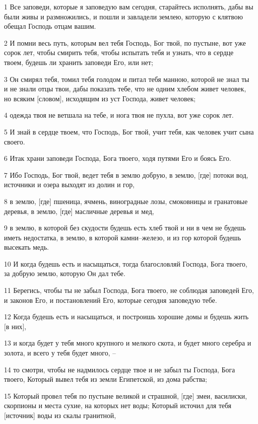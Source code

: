 \par 1 Все заповеди, которые я заповедую вам сегодня, старайтесь исполнять, дабы вы были живы и размножились, и пошли и завладели землею, которую с клятвою обещал Господь отцам вашим.
\par 2 И помни весь путь, которым вел тебя Господь, Бог твой, по пустыне, вот уже сорок лет, чтобы смирить тебя, чтобы испытать тебя и узнать, что в сердце твоем, будешь ли хранить заповеди Его, или нет;
\par 3 Он смирял тебя, томил тебя голодом и питал тебя манною, которой не знал ты и не знали отцы твои, дабы показать тебе, что не одним хлебом живет человек, но всяким [словом], исходящим из уст Господа, живет человек;
\par 4 одежда твоя не ветшала на тебе, и нога твоя не пухла, вот уже сорок лет.
\par 5 И знай в сердце твоем, что Господь, Бог твой, учит тебя, как человек учит сына своего.
\par 6 Итак храни заповеди Господа, Бога твоего, ходя путями Его и боясь Его.
\par 7 Ибо Господь, Бог твой, ведет тебя в землю добрую, в землю, [где] потоки вод, источники и озера выходят из долин и гор,
\par 8 в землю, [где] пшеница, ячмень, виноградные лозы, смоковницы и гранатовые деревья, в землю, [где] масличные деревья и мед,
\par 9 в землю, в которой без скудости будешь есть хлеб твой и ни в чем не будешь иметь недостатка, в землю, в которой камни--железо, и из гор которой будешь высекать медь.
\par 10 И когда будешь есть и насыщаться, тогда благословляй Господа, Бога твоего, за добрую землю, которую Он дал тебе.
\par 11 Берегись, чтобы ты не забыл Господа, Бога твоего, не соблюдая заповедей Его, и законов Его, и постановлений Его, которые сегодня заповедую тебе.
\par 12 Когда будешь есть и насыщаться, и построишь хорошие домы и будешь жить [в них],
\par 13 и когда будет у тебя много крупного и мелкого скота, и будет много серебра и золота, и всего у тебя будет много, --
\par 14 то смотри, чтобы не надмилось сердце твое и не забыл ты Господа, Бога твоего, Который вывел тебя из земли Египетской, из дома рабства;
\par 15 Который провел тебя по пустыне великой и страшной, [где] змеи, василиски, скорпионы и места сухие, на которых нет воды; Который источил для тебя [источник] воды из скалы гранитной,
